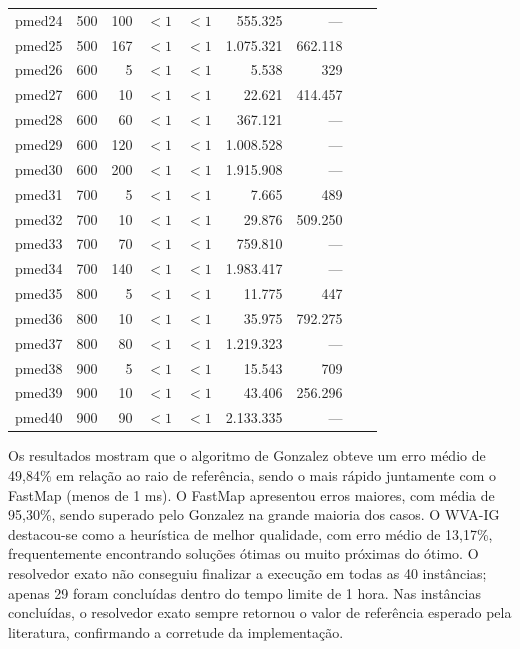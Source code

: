 \documentclass[12pt]{article}
\begin{document}
\begin{table}[p]
\begin{tabular}{lrrrrrrrr}
pmed24 & 500 & 100 & $< 1$ & $< 1$ & 555.325 & --- \\
pmed25 & 500 & 167 & $< 1$ & $< 1$ & 1.075.321 & 662.118 \\
pmed26 & 600 & 5   & $< 1$ & $< 1$ & 5.538  & 329 \\
pmed27 & 600 & 10  & $< 1$ & $< 1$ & 22.621 & 414.457 \\
pmed28 & 600 & 60  & $< 1$ & $< 1$ & 367.121 & --- \\
pmed29 & 600 & 120 & $< 1$ & $< 1$ & 1.008.528 & --- \\
pmed30 & 600 & 200 & $< 1$ & $< 1$ & 1.915.908 & --- \\
pmed31 & 700 & 5   & $< 1$ & $< 1$ & 7.665  & 489 \\
pmed32 & 700 & 10  & $< 1$ & $< 1$ & 29.876 & 509.250 \\
pmed33 & 700 & 70  & $< 1$ & $< 1$ & 759.810 & --- \\
pmed34 & 700 & 140 & $< 1$ & $< 1$ & 1.983.417 & --- \\
pmed35 & 800 & 5   & $< 1$ & $< 1$ & 11.775 & 447 \\
pmed36 & 800 & 10  & $< 1$ & $< 1$ & 35.975 & 792.275 \\
pmed37 & 800 & 80  & $< 1$ & $< 1$ & 1.219.323 & --- \\
pmed38 & 900 & 5   & $< 1$ & $< 1$ & 15.543 & 709 \\
pmed39 & 900 & 10  & $< 1$ & $< 1$ & 43.406 & 256.296 \\
pmed40 & 900 & 90  & $< 1$ & $< 1$ & 2.133.335 & --- \\
\hline
\end{tabular}
\end{table}

Os resultados mostram que o algoritmo de Gonzalez obteve um erro médio de 49,84\% em relação ao raio de referência, sendo o mais rápido juntamente com o FastMap (menos de 1 ms). O FastMap apresentou erros maiores, com média de 95,30\%, sendo superado pelo Gonzalez na grande maioria dos casos. O WVA-IG destacou-se como a heurística de melhor qualidade, com erro médio de 13,17\%, frequentemente encontrando soluções ótimas ou muito próximas do ótimo. O resolvedor exato não conseguiu finalizar a execução em todas as 40 instâncias; apenas 29 foram concluídas dentro do tempo limite de 1 hora. Nas instâncias concluídas, o resolvedor exato sempre retornou o valor de referência esperado pela literatura, confirmando a corretude da implementação.
\end{document}
